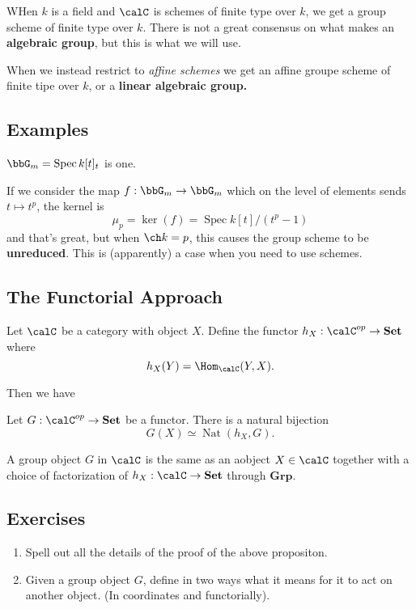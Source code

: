 \documentclass[12pt]{article}
\begin{document}
WHen $k$ is a field and $\calC$ is schemes of finite type over $k$, we get a group scheme of finite type over $k$. There is not a great consensus on what makes an \textbf{algebraic group}, 
but this is what we will use.

When we instead restrict to \textit{affine schemes} we get an affine groupe scheme of finite tipe over $k$, or a \textbf{linear algebraic group.}

\subsection{Examples}
$\bbG_m=\operatorname{Spec} k[t]_t$ is one. 

If we consider the map $f:\bbG_m\to \bbG_m$ which on the level of elements sends $t\mapsto t^p$, the kernel is 
\[\mu_p=\ker(f)=\operatorname{Spec}k[t]/(t^p-1)\]
and that's great, but when $\ch k=p$, this causes the group scheme to be \textbf{unreduced}. This is (apparently) a case when you need to use schemes.

\subsection{The Functorial Approach}
Let $\calC$ be a category with object $X$. Define the functor $h_X:\calC^{op}\to \mathbf{Set}$ where 
\[h_X(Y)=\Hom_\calC(Y,X).\]

Then we have 
\begin{lem}[Yoneda]
	Let $G:\calC^{op}\to\mathbf{Set}$ be a functor. There is a natural bijection
	\[G(X)\simeq \operatorname{Nat}(h_X,G).\]
\end{lem}
\begin{prop}
	A group object $G$ in $\calC$  is the same as an aobject $X\in\calC$ together with a choice of factorization of 
	$h_X:\calC\to\mathbf{Set}$ through $\mathbf{Grp}$.
\end{prop}

\subsection{Exercises}
\begin{enumerate}
	\item Spell out all the details of the proof of the above propositon.
	\item Given a group object $G$, define in two ways what it means for it to act on another object. (In coordinates and functorially).
\end{enumerate}
\end{document}
